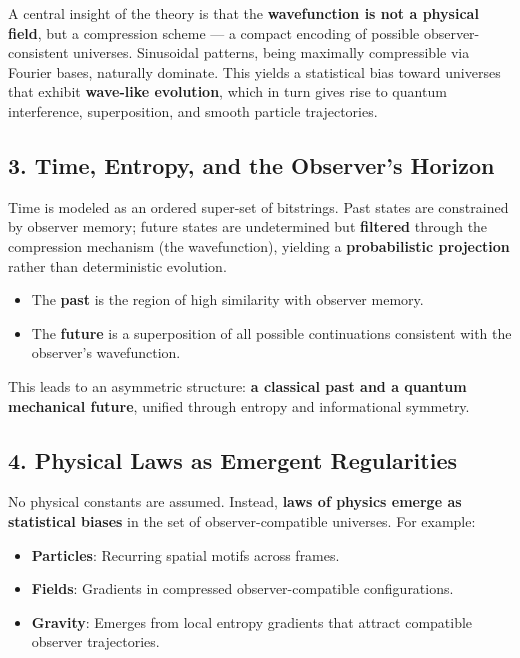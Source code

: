 \documentclass[11pt]{article}
\begin{document}
A central insight of the theory is that the \textbf{wavefunction is not a physical field}, but a compression scheme — a compact encoding of possible observer-consistent universes. Sinusoidal patterns, being maximally compressible via Fourier bases, naturally dominate. This yields a statistical bias toward universes that exhibit \textbf{wave-like evolution}, which in turn gives rise to quantum interference, superposition, and smooth particle trajectories.

\subsection*{3. Time, Entropy, and the Observer's Horizon}

Time is modeled as an ordered super-set of bitstrings. Past states are constrained by observer memory; future states are undetermined but \textbf{filtered} through the compression mechanism (the wavefunction), yielding a \textbf{probabilistic projection} rather than deterministic evolution.

\begin{itemize}
      \item The \textbf{past} is the region of high similarity with observer memory.
      \item The \textbf{future} is a superposition of all possible continuations consistent with the observer’s wavefunction.
\end{itemize}

This leads to an asymmetric structure: \textbf{a classical past and a quantum mechanical future}, unified through entropy and informational symmetry.

\subsection*{4. Physical Laws as Emergent Regularities}

No physical constants are assumed. Instead, \textbf{laws of physics emerge as statistical biases} in the set of observer-compatible universes. For example:

\begin{itemize}
      \item \textbf{Particles}: Recurring spatial motifs across frames.
      \item \textbf{Fields}: Gradients in compressed observer-compatible configurations.
      \item \textbf{Gravity}: Emerges from local entropy gradients that attract compatible observer trajectories.
\end{itemize}
\end{document}
